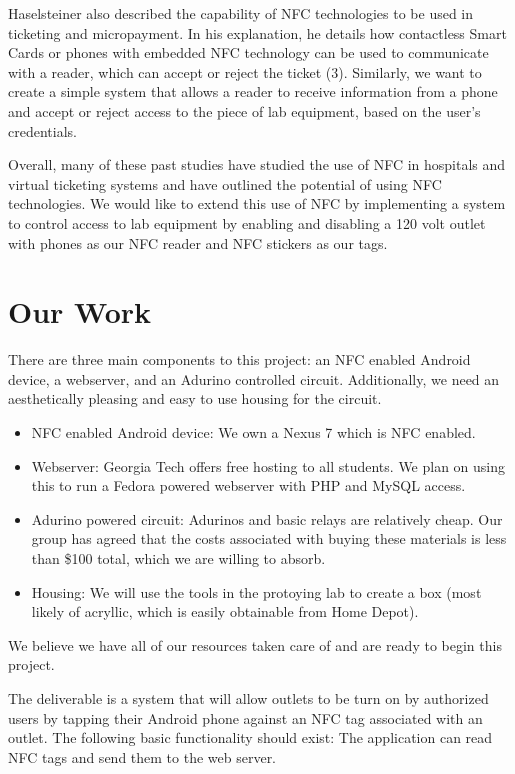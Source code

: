 \documentclass{sigchi}
\begin{document}
Haselsteiner also described the capability of NFC technologies to be used in ticketing and micropayment. In his explanation, he details how contactless Smart Cards or phones with embedded NFC technology can be used to communicate with a reader, which can accept or reject the ticket (3). Similarly, we want to create a simple system that allows a reader to receive information from a phone and accept or reject access to the piece of lab equipment, based on the user’s credentials. 

Overall, many of these past studies have studied the use of NFC in hospitals and virtual ticketing systems and have outlined the potential of using NFC technologies. We would like to extend this use of NFC by implementing a system to control access to lab equipment by enabling and disabling a 120 volt outlet with phones as our NFC reader and NFC stickers as our tags.

\section{Our Work}

There are three main components to this project: an NFC enabled Android device, a webserver, and an Adurino controlled circuit. Additionally, we need an aesthetically pleasing and easy to use housing for the circuit.
\begin{itemize}
\item NFC enabled Android device: We own a Nexus 7 which is NFC enabled.
\item Webserver: Georgia Tech offers free hosting to all students. We plan on using this to run a Fedora powered webserver with PHP and MySQL access.
\item Adurino powered circuit: Adurinos and basic relays are relatively cheap. Our group has agreed that the costs associated with buying these materials is less than \$100 total, which we are willing to absorb.
\item Housing: We will use the tools in the protoying lab to create a box (most likely of acryllic, which is easily obtainable from Home Depot).
\end{itemize}
We believe we have all of our resources taken care of and are ready to begin this project.

The deliverable is a system that will allow outlets to be turn on by authorized users by tapping their Android phone against an NFC tag associated with an outlet. The following basic functionality should exist:
The application can read NFC tags and send them to the web server. 
\end{document}
